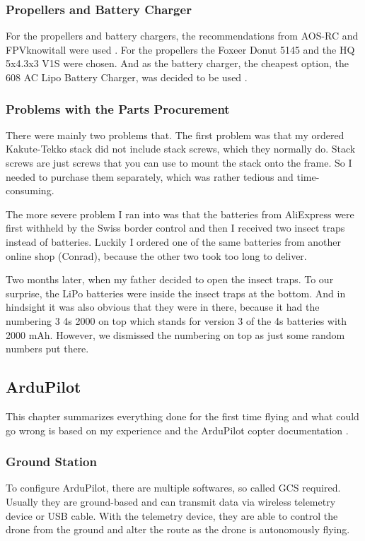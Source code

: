 \documentclass[svgnames]{article}
\begin{document}
	\subsubsection{Propellers and Battery Charger}
	For the propellers and battery chargers, the recommendations from AOS-RC and FPVknowitall were used \cite{aosrc, fpvknowbattery}. For the propellers the Foxeer Donut 5145  and the HQ 5x4.3x3 V1S \cite{toroidal, hqprops} were chosen. And as the battery charger, the cheapest option, the 608 AC Lipo Battery Charger, was decided to be used \cite{lipocharger}.


	\subsubsection{Problems with the Parts Procurement}
	There were mainly two problems that. The first problem was that my ordered Kakute-Tekko stack did not include stack screws, which they normally do. Stack screws are just screws that you can use to mount the stack onto the frame. So I needed to purchase them separately, which was rather tedious and time-consuming.
	
	The more severe problem I ran into was that the batteries from AliExpress were first withheld by the Swiss border control and then I received two insect traps instead of batteries. Luckily I ordered one of the same batteries from another online shop (Conrad), because the other two took too long to deliver.
	
	Two months later, when my father decided to open the insect traps. To our surprise, the \gls{LiPo} batteries were inside the insect traps at the bottom. And in hindsight it was also obvious that they were in there, because it had the numbering 3 4s 2000 on top which stands for version 3 of the 4s batteries with 2000 mAh. However, we dismissed the numbering on top as just some random numbers put there. 
	

	\subsection{ArduPilot}
	This chapter summarizes everything done for the first time flying and what could go wrong is based on my experience and the ArduPilot copter documentation \cite{ardupilotdocs}.
	
	\subsubsection{Ground Station}
	To configure ArduPilot, there are multiple softwares, so called \gls{GCS} required. Usually they are ground-based and can transmit data via wireless telemetry device or USB cable.  With the telemetry device, they are able to control the drone from the ground and alter the route as the drone is autonomously flying. 
	
\end{document}
